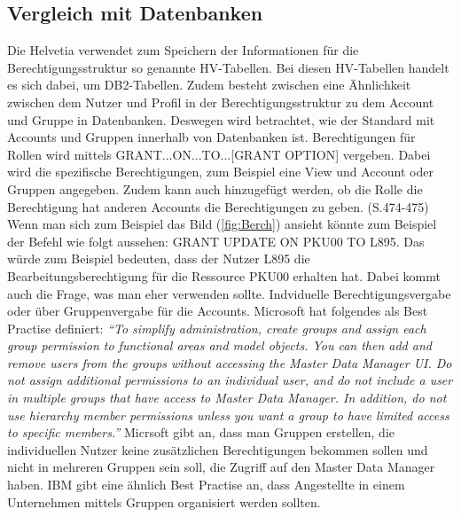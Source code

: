 \subsection{Vergleich mit Datenbanken}
\label{sec:chapter04:DB}
Die Helvetia verwendet zum Speichern der Informationen für die Berechtigungsstruktur so genannte HV-Tabellen.
Bei diesen HV-Tabellen handelt es sich dabei, um DB2-Tabellen.
Zudem besteht zwischen eine Ähnlichkeit zwischen dem Nutzer und Profil in der Berechtigungsstruktur zu dem Account und Gruppe in Datenbanken.
Deswegen wird betrachtet, wie der Standard mit Accounts und Gruppen innerhalb von Datenbanken ist.
\newline
Berechtigungen für Rollen wird mittels GRANT...ON...TO...[GRANT OPTION] vergeben.
Dabei wird die spezifische Berechtigungen, zum Beispiel eine View und Account oder Gruppen angegeben.
Zudem kann auch hinzugefügt werden, ob die Rolle die Berechtigung hat anderen Accounts die Berechtigungen zu geben.\cite{Ram09} (S.474-475)
\newline
Wenn man sich zum Beispiel das Bild (\ref{fig:Berch}) ansieht könnte zum Beispiel der Befehl wie folgt aussehen:
\newline
\newline
GRANT UPDATE ON PKU00 TO L895.
\newline
\newline
Das würde zum Beispiel bedeuten, dass der Nutzer L895 die Bearbeitungsberechtigung für die Ressource PKU00 erhalten hat.
Dabei kommt auch die Frage, was man eher verwenden sollte.
Indviduelle Berechtigungsvergabe oder über Gruppenvergabe für die Accounts.
Microsoft hat folgendes als Best Practise definiert:
\newline
\newline
\textit{"`To simplify administration, create groups and assign each group permission to functional areas and model objects.
You can then add and remove users from the groups without accessing the Master Data Manager UI.
\newline
\newline
Do not assign additional permissions to an individual user, and do not include a user in multiple groups that have access to Master Data Manager. In addition, do not use hierarchy member permissions unless you want a group to have limited access to specific members."'} \cite{Micro}
\newline
\newline
Micrsoft gibt an, dass man Gruppen erstellen, die individuellen Nutzer keine zusätzlichen Berechtigungen bekommen sollen und nicht in mehreren Gruppen sein soll, die Zugriff auf den Master Data Manager haben.
IBM gibt eine ähnlich Best Practise an, dass Angestellte in einem Unternehmen mittels Gruppen organisiert werden sollten. \cite{IBMGroup}

